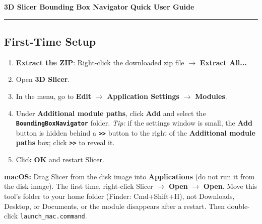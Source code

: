 \documentclass[10pt,a4paper]{article}
\begin{document}
{\Large\bfseries\color{darkblue} 3D Slicer Bounding Box Navigator} \hfill {\small\bfseries Quick User Guide}\\[-0.2cm]
\rule{\textwidth}{0.8pt}

\vspace{0.05cm}
\subsection*{First-Time Setup}
\begin{enumerate}[leftmargin=1.5em, itemsep=0.5pt, topsep=1pt]
    \item \textbf{Extract the ZIP}: Right-click the downloaded zip file $\rightarrow$ \textbf{Extract All...}
    \item Open \textbf{3D Slicer}.
    \item In the menu, go to \textbf{Edit} $\rightarrow$ \textbf{Application Settings} $\rightarrow$ \textbf{Modules}.
    \item Under \textbf{Additional module paths}, click \textbf{Add} and select the \textbf{\texttt{BoundingBoxNavigator}} folder.
    \textit{Tip:} if the settings window is small, the \textbf{Add} button is hidden behind a \textbf{\texttt{>{}>}} button to the right of the \textbf{Additional module paths} box; click \textbf{\texttt{>{}>}} to reveal it.
    \item Click \textbf{OK} and restart Slicer.
\end{enumerate}
{\footnotesize\noindent\textbf{macOS:} Drag Slicer from the disk image into \textbf{Applications} (do not run it from the disk image). The first time, right-click Slicer $\rightarrow$ \textbf{Open} $\rightarrow$ \textbf{Open}. Move this tool's folder to your home folder (Finder: Cmd+Shift+H), not Downloads, Desktop, or Documents, or the module disappears after a restart. Then double-click \texttt{launch\_mac.command}.\par}
\end{document}
